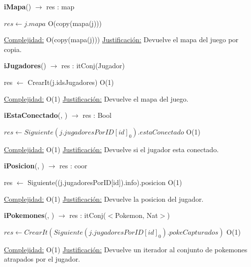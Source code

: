 \begin{algorithm}[H]{\textbf{iMapa}() $\to$ res : map} 
	{}
	\begin{algorithmic}
		\State $res \gets j.mapa $ \Comment O(copy(mapa(j)))
	
		\medskip
		\Statex \underline{Complejidad:} O(copy(mapa(j)))
		\Statex \underline{Justificación:} Devuelve el mapa del juego por copia.
    \end{algorithmic}
\end{algorithm}

\begin{algorithm}[H]{\textbf{iJugadores}() $\to$ res : itConj(Jugador)} 
	{}
	\begin{algorithmic}
		\State res $\gets$ CrearIt(j.idsJugadores)	\Comment O(1)
	
		\medskip
		\Statex \underline{Complejidad:} O(1)
		\Statex \underline{Justificación:} Devuelve el mapa del juego.
    \end{algorithmic}
\end{algorithm}

\begin{algorithm}[H]{\textbf{iEstaConectado}(, ) $\to$ res : Bool} 
	{}
	\begin{algorithmic}
		\State $res \gets Siguiente(j.jugadoresPorID[id]_0).estaConectado $ \Comment O(1)
	
		\medskip
		\Statex \underline{Complejidad:} O(1)
		\Statex \underline{Justificación:} Devuelve si el jugador esta conectado.
    \end{algorithmic}
\end{algorithm}

\begin{algorithm}[H]{\textbf{iPosicion}(, ) $\to$ res : coor} 
	{}
	\begin{algorithmic}
		\State res $\gets$ Siguiente((j.jugadoresPorID[id]).info).posicion  \Comment O(1)
	
		\medskip
		\Statex \underline{Complejidad:} O(1)
		\Statex \underline{Justificación:} Devuelve la posicion del jugador.
    \end{algorithmic}
\end{algorithm}

\begin{algorithm}[H]{\textbf{iPokemones}(, ) $\to$ res : itConj($<$Pokemon, Nat$>$)} 
	{}
	\begin{algorithmic}
		\State $res \gets CrearIt(Siguiente(j.jugadoresPorID[id]_0).pokeCapturados) $ \Comment O(1)
	
		\medskip
		\Statex \underline{Complejidad:} O(1)
		\Statex \underline{Justificación:} Devuelve un iterador al conjunto de pokemones atrapados por el jugador.
    \end{algorithmic}
\end{algorithm}

